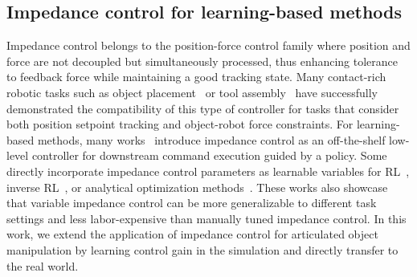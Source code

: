 \subsection{Impedance control for learning-based methods}

Impedance control belongs to the position-force control family where position and force are not decoupled but simultaneously processed, thus enhancing tolerance to feedback force while maintaining a good tracking state. Many contact-rich robotic tasks such as object placement~\cite{industreal} or tool assembly~\cite{admitlearn,atla,factory,fmb,genchip} have successfully demonstrated the compatibility of this type of controller for tasks that consider both position setpoint tracking and object-robot force constraints. For learning-based methods, many works~\cite{manipllm,rgbmanip,imagemanip} introduce impedance control as an off-the-shelf low-level controller for downstream command execution guided by a policy. Some directly incorporate impedance control parameters as learnable variables for RL~\cite{admitlearn,variable}, inverse RL~\cite{impedance_irl}, or analytical optimization methods~\cite{compliancetuning}. These works also showcase that variable impedance control can be more generalizable to different task settings and less labor-expensive than manually tuned impedance control. In this work, we extend the application of impedance control for articulated object manipulation by learning control gain in the simulation and directly transfer to the real world.
